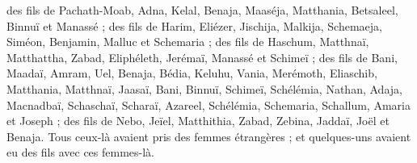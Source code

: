 \begin{multicols}{2}
des fils de Pachath-Moab, Adna, Kelal, Benaja, Maaséja, Matthania, Betsaleel, Binnuï et Manassé ;
des fils de Harim, Eliézer, Jischija, Malkija, Schemaeja, Siméon,
Benjamin, Malluc et Schemaria ;
des fils de Haschum, Matthnaï, Matthattha, Zabad, Eliphéleth, Jerémaï, Manassé et Schimeï ;
des fils de Bani, Maadaï, Amram, Uel,
Benaja, Bédia, Keluhu,
Vania, Merémoth, Eliaschib,
Matthania, Matthnaï, Jaasaï,
Bani, Binnuï, Schimeï,
Schélémia, Nathan, Adaja,
Macnadbaï, Schaschaï, Scharaï,
Azareel, Schélémia, Schemaria,
Schallum, Amaria et Joseph ;
des fils de Nebo, Jeïel, Matthithia, Zabad, Zebina, Jaddaï, Joël et Benaja.
Tous ceux-là avaient pris des femmes étrangères ; et  quelques-uns avaient eu des fils avec ces femmes-là.
\PPE{}
\end{multicols}
